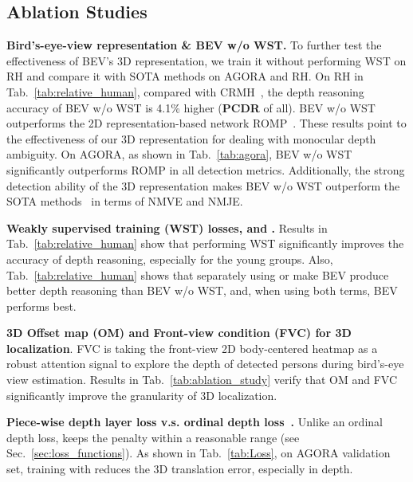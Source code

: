 \documentclass[10pt,twocolumn,letterpaper]{article}
\begin{document}
\subsection{Ablation Studies}





\textbf{Bird's-eye-view representation \&\/ BEV w/o WST.}
To further test the effectiveness of BEV's 3D representation, we train it without performing WST on RH and compare it with SOTA methods on AGORA and RH.
On RH in Tab.~\ref{tab:relative_human}, compared with CRMH~\cite{jiang2020coherent}, the depth reasoning accuracy of BEV w/o WST is 4.1\% higher (\textbf{PCDR} of all).
BEV w/o WST outperforms the 2D representation-based network ROMP~\cite{romp}.
These results point to the effectiveness of our 3D representation for dealing with monocular depth ambiguity.
On AGORA, as shown in Tab.~\ref{tab:agora}, BEV w/o WST significantly outperforms ROMP in all detection metrics.
Additionally, the strong detection ability of the 3D representation makes BEV w/o WST outperform the SOTA methods~\cite{romp,Kocabas_SPEC_2021,patel2021agora} in terms of NMVE and NMJE. 



\textbf{Weakly supervised training (WST) losses,  and .}
Results in Tab.~\ref{tab:relative_human} show that performing WST significantly improves the accuracy of depth reasoning, especially for the young groups.
Also, Tab.~\ref{tab:relative_human} shows that separately using  or  make BEV produce better depth reasoning than BEV w/o WST, and, when using both terms, BEV performs best.


\textbf{3D Offset map (OM) and Front-view condition (FVC) for 3D localization}. 
FVC is taking the front-view 2D body-centered heatmap as a robust attention signal to explore the depth of detected persons during bird's-eye view estimation. 
Results in Tab.~\ref{tab:ablation_study} verify that OM and FVC significantly improve the granularity of 3D localization. 




\textbf{Piece-wise depth layer loss  v.s. ordinal depth loss~\cite{wang2020hmor}.}
Unlike an ordinal depth loss,  keeps the penalty within a reasonable range (see Sec.~\ref{sec:loss_functions}).
As shown in Tab.~\ref{tab:Loss}, on AGORA validation set, training with  reduces the 3D translation error, especially in depth.
\end{document}
